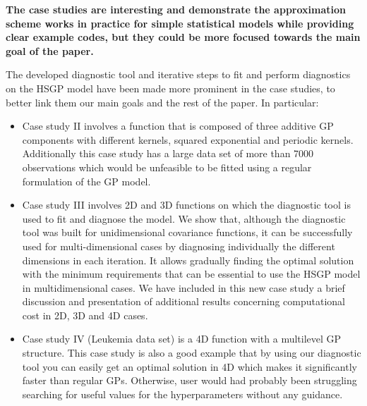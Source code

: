\documentclass[11pt]{report}
\begin{document}
\textbf{The case studies are interesting and demonstrate the approximation scheme works in practice for simple statistical models while providing clear example codes, but they could be more focused towards the main goal of the paper.}

The developed diagnostic tool and iterative steps to fit and perform diagnostics on the HSGP model have been made more prominent in the case studies, to better link them our main goals and the rest of the paper. In particular:


\begin{itemize}

\item Case study II involves a function that is composed of three additive GP components with different kernels, squared exponential and periodic kernels. Additionally this case study has a large data set of more than 7000 observations which would be unfeasible to be fitted using a regular formulation of the GP model.

\item Case study III involves 2D and 3D functions on which the diagnostic tool is used to fit and diagnose the model. We show that, although the diagnostic tool was built for unidimensional covariance functions, it can be successfully used for multi-dimensional cases by diagnosing individually the different dimensions in each iteration. It allows gradually finding the optimal solution with the minimum requirements that can be essential to use the HSGP model in multidimensional cases. We have included in this new case study a brief discussion and presentation of additional results concerning computational cost in 2D, 3D and 4D cases.

\item Case study IV (Leukemia data set) is a 4D function with a multilevel GP structure. This case study is also a good example that by using our diagnostic tool you can easily get an optimal solution in 4D which makes it significantly faster than regular GPs. Otherwise, user would had probably been struggling searching for useful values for the hyperparameters without any guidance.
\end{itemize}
\end{document}
